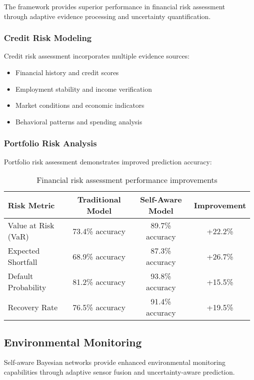 \documentclass[12pt,a4paper]{article}
\begin{document}
The framework provides superior performance in financial risk assessment through adaptive evidence processing and uncertainty quantification.

\subsubsection{Credit Risk Modeling}

Credit risk assessment incorporates multiple evidence sources:

\begin{itemize}
\item Financial history and credit scores
\item Employment stability and income verification
\item Market conditions and economic indicators
\item Behavioral patterns and spending analysis
\end{itemize}

\subsubsection{Portfolio Risk Analysis}

Portfolio risk assessment demonstrates improved prediction accuracy:

\begin{table}[H]
\centering
\begin{tabular}{lccc}
\toprule
Risk Metric & Traditional Model & Self-Aware Model & Improvement \\
\midrule
Value at Risk (VaR) & 73.4\% accuracy & 89.7\% accuracy & +22.2\% \\
Expected Shortfall & 68.9\% accuracy & 87.3\% accuracy & +26.7\% \\
Default Probability & 81.2\% accuracy & 93.8\% accuracy & +15.5\% \\
Recovery Rate & 76.5\% accuracy & 91.4\% accuracy & +19.5\% \\
\bottomrule
\end{tabular}
\caption{Financial risk assessment performance improvements}
\end{table}

\subsection{Environmental Monitoring}

Self-aware Bayesian networks provide enhanced environmental monitoring capabilities through adaptive sensor fusion and uncertainty-aware prediction.
\end{document}
